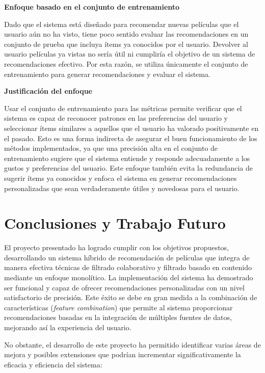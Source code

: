 \documentclass{llncs}
\begin{document}
		\textbf{Enfoque basado en el conjunto de entrenamiento}
		
		Dado que el sistema está diseñado para recomendar nuevas películas que el usuario aún no ha visto, tiene poco sentido evaluar las recomendaciones en un conjunto de prueba que incluya ítems ya conocidos por el usuario. Devolver al usuario películas ya vistas no sería útil ni cumpliría el objetivo de un sistema de recomendaciones efectivo. Por esta razón, se utiliza únicamente el conjunto de entrenamiento para generar recomendaciones y evaluar el sistema.
		
		\textbf{Justificación del enfoque}
		
		Usar el conjunto de entrenamiento para las métricas permite verificar que el sistema es capaz de reconocer patrones en las preferencias del usuario y seleccionar ítems similares a aquellos que el usuario ha valorado positivamente en el pasado. Esto es una forma indirecta de asegurar el buen funcionamiento de los métodos implementados, ya que una precisión alta en el conjunto de entrenamiento sugiere que el sistema entiende y responde adecuadamente a los gustos y preferencias del usuario. Este enfoque también evita la redundancia de sugerir ítems ya conocidos y enfoca el sistema en generar recomendaciones personalizadas que sean verdaderamente útiles y novedosas para el usuario.
		
	 
	
	\section{Conclusiones y Trabajo Futuro}
	El proyecto presentado ha logrado cumplir con los objetivos propuestos, desarrollando un sistema híbrido de recomendación de películas que integra de manera efectiva técnicas de filtrado colaborativo y filtrado basado en contenido mediante un enfoque monolítico. La implementación del sistema ha demostrado ser funcional y capaz de ofrecer recomendaciones personalizadas con un nivel satisfactorio de precisión. Este éxito se debe en gran medida a la combinación de características (\textit{feature combination}) que permite al sistema proporcionar recomendaciones basadas en la integración de múltiples fuentes de datos, mejorando así la experiencia del usuario.
	
	No obstante, el desarrollo de este proyecto ha permitido identificar varias áreas de mejora y posibles extensiones que podrían incrementar significativamente la eficacia y eficiencia del sistema:
	
\end{document}
